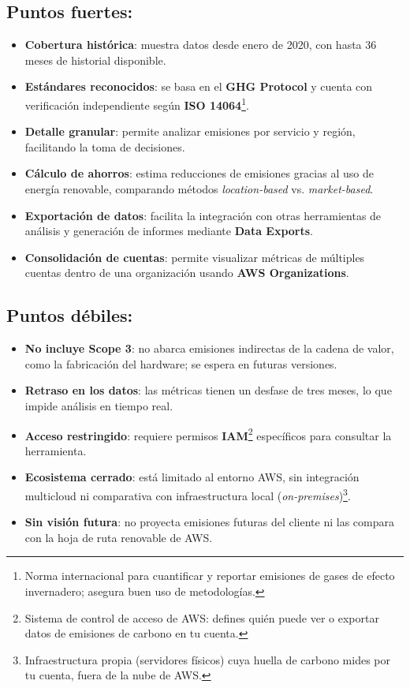 \documentclass[12pt,a4paper]{report}
\begin{document}
\subsection*{Puntos fuertes:}
\begin{itemize}
  \item \textbf{Cobertura histórica}: muestra datos desde enero de 2020, con hasta 36 meses de historial disponible.
  \item \textbf{Estándares reconocidos}: se basa en el \textbf{GHG Protocol} y cuenta con verificación independiente según \textbf{ISO 14064}\footnote{Norma internacional para cuantificar y reportar emisiones de gases de efecto invernadero; asegura buen uso de metodologías.}.
  \item \textbf{Detalle granular}: permite analizar emisiones por servicio y región, facilitando la toma de decisiones.
  \item \textbf{Cálculo de ahorros}: estima reducciones de emisiones gracias al uso de energía renovable, comparando métodos \textit{location-based} vs. \textit{market-based}.
  \item \textbf{Exportación de datos}: facilita la integración con otras herramientas de análisis y generación de informes mediante \textbf{Data Exports}.
  \item \textbf{Consolidación de cuentas}: permite visualizar métricas de múltiples cuentas dentro de una organización usando \textbf{AWS Organizations}.
\end{itemize}
\subsection*{Puntos débiles:}
\begin{itemize}
  \item \textbf{No incluye Scope 3}: no abarca emisiones indirectas de la cadena de valor, como la fabricación del hardware; se espera en futuras versiones.
  \item \textbf{Retraso en los datos}: las métricas tienen un desfase de tres meses, lo que impide análisis en tiempo real.
  \item \textbf{Acceso restringido}: requiere permisos \textbf{IAM}\footnote{Sistema de control de acceso de AWS: defines quién puede ver o exportar datos de emisiones de carbono en tu cuenta.} específicos para consultar la herramienta.
  \item \textbf{Ecosistema cerrado}: está limitado al entorno AWS, sin integración multicloud ni comparativa con infraestructura local (\textit{on-premises})\footnote{Infraestructura propia (servidores físicos) cuya huella de carbono mides por tu cuenta, fuera de la nube de AWS.}.
  \item \textbf{Sin visión futura}: no proyecta emisiones futuras del cliente ni las compara con la hoja de ruta renovable de AWS.
\end{itemize}
\end{document}
